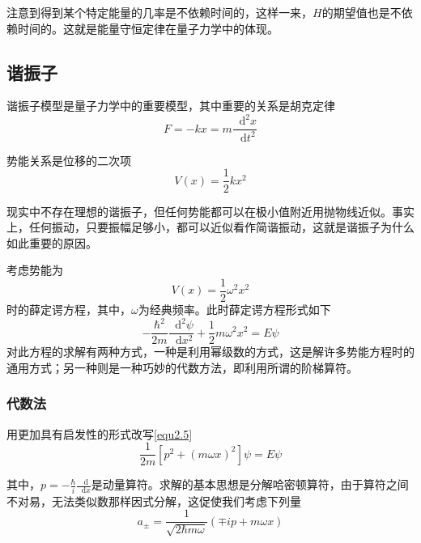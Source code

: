 \documentclass[UTF8]{ctexart}
\begin{document}
\noindent 注意到得到某个特定能量的几率是不依赖时间的，这样一来，$H$的期望值也是不依赖时间的。这就是能量守恒定律在量子力学中的体现。

    \subsection{谐振子}
    谐振子模型是量子力学中的重要模型，其中重要的关系是胡克定律
    \begin{equation}
        F = - k x = m \frac{\mathop{}\!\mathrm{d} ^2 x}{\mathop{}\!\mathrm{d} t^2}
    \end{equation}

\noindent 势能关系是位移的二次项
\begin{equation}
    V(x) = \frac{1}{2} k x^2
\end{equation}

    现实中不存在理想的谐振子，但任何势能都可以在极小值附近用抛物线近似。事实上，任何振动，只要振幅足够小，都可以近似看作简谐振动，这就是谐振子为什么如此重要的原因。

    考虑势能为
    \begin{equation}
        V(x) = \frac{1}{2} \omega^2 x^2
    \end{equation}
\noindent 时的薛定谔方程，其中，$\omega$为经典频率。此时薛定谔方程形式如下
\begin{equation}
    - \frac{\hbar^2}{2m} \frac{\mathop{}\!\mathrm{d} ^2 \psi}{\mathop{}\!\mathrm{d} x^2} + \frac{1}{2} m \omega^2 x^2 = E \psi \label{equ2.5}
\end{equation}
\noindent 对此方程的求解有两种方式，一种是利用幂级数的方式，这是解许多势能方程时的通用方式；另一种则是一种巧妙的代数方法，即利用所谓的阶梯算符。

    \subsubsection{代数法}
    用更加具有启发性的形式改写\autoref{equ2.5}
    \begin{equation}
        \frac{1}{2m} \left[p^2 + (m \omega x)^2\right] \psi = E \psi 
    \end{equation}

\noindent 其中，$p = - \frac{\hbar}{i} \frac{\mathop{}\!\mathrm{d} }{\mathop{}\!\mathrm{d}  x}$是动量算符。求解的基本思想是分解哈密顿算符，由于算符之间不对易，无法类似数那样因式分解，这促使我们考虑下列量
\begin{equation}
    a_{\pm} = \frac{1}{\sqrt{2 \hbar m \omega}} (\mp i p + m \omega x)
\end{equation}
\end{document}
